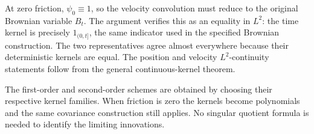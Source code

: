 \documentclass[11pt,a4paper]{article}
\begin{document}
At zero friction, \(\psi_0\equiv1\), so the velocity convolution must reduce to the original Brownian variable \(B_t\). The argument verifies this as an equality in \(L^{2}\): the time kernel is precisely \(1_{(0,t]}\), the same indicator used in the specified Brownian construction. The two representatives agree almost everywhere because their deterministic kernels are equal. The position and velocity \(L^{2}\)-continuity statements follow from the general continuous-kernel theorem.



The first-order and second-order schemes are obtained by choosing their respective kernel families. When friction is zero the kernels become polynomials and the same covariance construction still applies. No singular quotient formula is needed to identify the limiting innovations.
\end{document}
